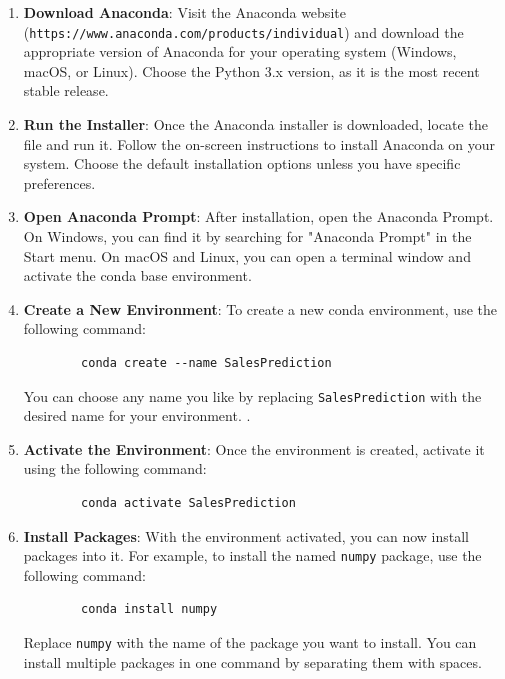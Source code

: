 \begin{enumerate}
	\item \textbf{Download Anaconda}: Visit the Anaconda website (\texttt{https://www.anaconda.com/products/individual}) and download the appropriate version of Anaconda for your operating system (Windows, macOS, or Linux). Choose the Python 3.x version, as it is the most recent stable release.
	
	\item \textbf{Run the Installer}: Once the Anaconda installer is downloaded, locate the file and run it. Follow the on-screen instructions to install Anaconda on your system. Choose the default installation options unless you have specific preferences.
	
	\item \textbf{Open Anaconda Prompt}: After installation, open the Anaconda Prompt. On Windows, you can find it by searching for "Anaconda Prompt" in the Start menu. On macOS and Linux, you can open a terminal window and activate the conda base environment.
	
	\item \textbf{Create a New Environment}: To create a new conda environment, use the following command:
	
	\begin{verbatim}
		conda create --name SalesPrediction
	\end{verbatim}
	
	You can choose any name you like by replacing \texttt{SalesPrediction} with the desired name for your environment. .
	
	\item \textbf{Activate the Environment}: Once the environment is created, activate it using the following command:
	
	\begin{verbatim}
		conda activate SalesPrediction
	\end{verbatim}
	
	
	\item \textbf{Install Packages}: With the environment activated, you can now install packages into it. For example, to install the  named \texttt{numpy} package, use the following command:
	
	\begin{verbatim}
		conda install numpy
	\end{verbatim}
	
	Replace \texttt{numpy} with the name of the package you want to install. You can install multiple packages in one command by separating them with spaces.
	

\end{enumerate}
